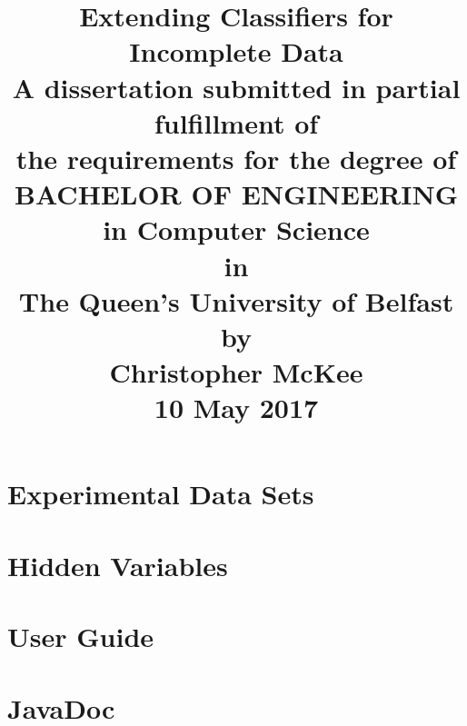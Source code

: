 \documentclass[12pt,a4paper]{report}
\begin{document}
\title{Extending Classifiers for Incomplete Data\\
\large
A dissertation submitted in partial fulfillment of\\
the requirements for the degree of\\
BACHELOR OF ENGINEERING in Computer Science\\
in\\
The Queen's University of Belfast\\
by\\
Christopher McKee\\
10 May 2017
}
\author{}
\date{}
\maketitle
\newpage


\tableofcontents
\listoftables
\listoffigures







\appendix
\chapter{Experimental Data Sets}
\label{datasets}

\chapter{Hidden Variables}
\label{hidden}

\chapter{User Guide}
\label{uguide}

\chapter{JavaDoc}
\label{JavaDoc}

\end{document}
